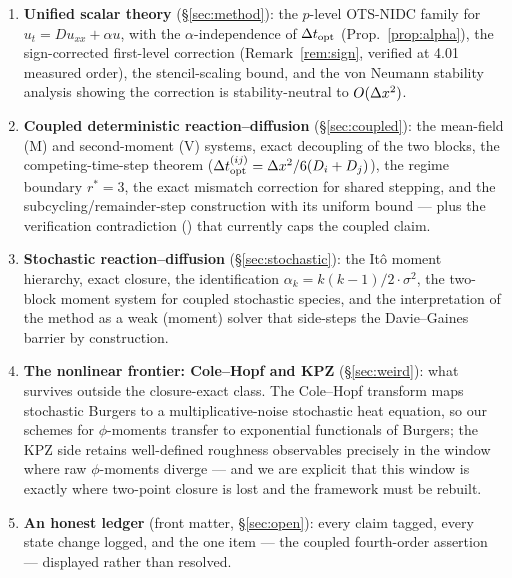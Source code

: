 \begin{enumerate}
\item \textbf{Unified scalar theory} (\S\ref{sec:method}): the $p$-level OTS-NIDC
family for $u_t = Du_{xx} + \alpha u$, with the $\alpha$-independence of $\Delta t_{\mathrm{opt}}$
(Prop.~\ref{prop:alpha}), the sign-corrected first-level correction
(Remark~\ref{rem:sign}, verified at 4.01 measured order), the stencil-scaling
bound, and the von Neumann stability analysis showing the correction is
stability-neutral to $O(\Delta x^2)$.
\item \textbf{Coupled deterministic reaction--diffusion} (\S\ref{sec:coupled}):
the mean-field (M) and second-moment (V) systems, exact decoupling of the two
blocks, the competing-time-step theorem ($\Delta t_{\mathrm{opt}}^{(ij)} = \Delta x^2/6(D_i+D_j)$), the
regime boundary $r^\ast=3$, the exact mismatch correction for shared stepping,
and the subcycling/remainder-step construction with its uniform bound --- plus the
verification contradiction (\tagC) that currently caps the coupled claim.
\item \textbf{Stochastic reaction--diffusion} (\S\ref{sec:stochastic}): the It\^o
moment hierarchy, exact closure, the identification $\alpha_k = k(k-1)/2\cdot
\sigma^2$, the two-block moment system for coupled stochastic species, and the
interpretation of the method as a weak (moment) solver that side-steps the
Davie--Gaines barrier by construction.
\item \textbf{The nonlinear frontier: Cole--Hopf and KPZ} (\S\ref{sec:weird}):
what survives outside the closure-exact class. The Cole--Hopf transform maps
stochastic Burgers to a multiplicative-noise stochastic heat equation, so our
schemes for $\phi$-moments transfer to exponential functionals of Burgers;
the KPZ side retains well-defined roughness observables precisely in the window
where raw $\phi$-moments diverge --- and we are explicit that this window is
exactly where two-point closure is lost and the framework must be rebuilt.
\item \textbf{An honest ledger} (front matter, \S\ref{sec:open}): every claim
tagged, every state change logged, and the one \tagC item --- the coupled
fourth-order assertion --- displayed rather than resolved.
\end{enumerate}
